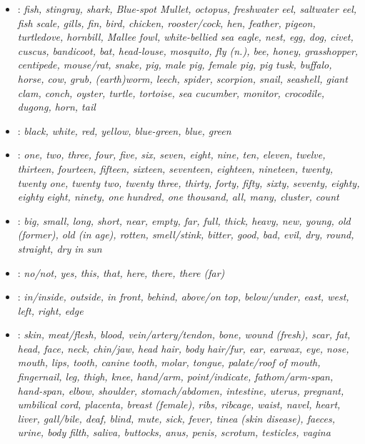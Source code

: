 \begin{itemize}
\item	{}: 
\it{fish},
\it{stingray},
shark,
Blue-spot Mullet,
octopus,
freshwater eel,
saltwater eel,
fish scale,
gills,
fin,
\it{bird},
chicken,
rooster/cock,
hen,
feather,
pigeon,
turtledove,
\it{hornbill},
Mallee fowl,
white-bellied sea eagle,
nest,
\it{egg},
\it{dog},
\it{civet},
\it{cuscus},
\it{bandicoot},
\it{bat},
\it{head-louse},
\it{mosquito},
\it{fly (n.)},
\it{bee},
honey,
grasshopper,
centipede,
\it{mouse/rat},
\it{snake},
\it{pig},
male pig,
female pig,
pig tusk,
buffalo,
\it{horse},
\it{cow},
\it{grub},
(earth)worm,
leech,
\it{spider},
\it{scorpion},
snail,
seashell,
giant clam,
conch,
oyster,
\it{turtle},
\it{tortoise},
\it{sea cucumber},
\it{monitor},
\it{crocodile},
\it{dugong},
\it{horn},
\it{tail}

\item	{}:
\it{black},
\it{white},
\it{red},
\it{yellow},
blue-green,
\it{blue},
\it{green}

\item	{}: 
\it{one},
\it{two},
\it{three},
\it{four},
\it{five},
\it{six},
\it{seven},
\it{eight},
\it{nine},
\it{ten},
eleven,
twelve,
thirteen,
fourteen,
fifteen,
sixteen,
seventeen,
eighteen,
nineteen,
\it{twenty},
twenty one,
twenty two,
twenty three,
thirty,
forty,
fifty,
sixty,
seventy,
eighty,
eighty eight,
ninety,
\it{one hundred},
\it{one thousand},
\it{all},
\it{many},
cluster,
count

\item	{}: \it{big},
\it{small},
\it{long},
\it{short},
near,
empty,
\it{far},
\it{full},
\it{thick},
\it{heavy},
\it{new},
\it{young},
\it{old (former)},
\it{old (in age)},
\it{rotten},
\it{smell/stink},
\it{bitter},
good,
bad,
\it{evil},
\it{dry},
\it{round},
\it{straight},
\it{dry in sun}

\item	{}: \it{no/not},
yes,
\it{this},
\it{that},
\it{here},
\it{there},
\it{there (far)}

\item	{}: 
\it{in/inside},
\it{outside},
\it{in front},
\it{behind},
\it{above/on top},
\it{below/under},
\it{east},
\it{west},
left,
right,
\it{edge}

\item	{}: 
\it{skin},
\it{meat/flesh},
\it{blood},
\it{vein/artery/tendon},
\it{bone},
wound (fresh),
scar,
fat,
\it{head},
\it{face},
\it{neck},
\it{chin/jaw},
\it{head hair},
\it{body hair/fur},
\it{ear},
earwax,
\it{eye},
\it{nose},
\it{mouth},
\it{lips},
\it{tooth},
canine tooth,
molar,
\it{tongue},
\it{palate/roof of mouth},
\it{fingernail},
\it{leg},
\it{thigh},
\it{knee},
\it{hand/arm},
\it{point/indicate},
\it{fathom/arm-span},
\it{hand-span},
\it{elbow},
\it{shoulder},
\it{stomach/abdomen},
intestine,
uterus,
\it{pregnant},
umbilical cord,
placenta,
\it{breast (female)},
\it{ribs},
ribcage,
\it{waist},
\it{navel},
\it{heart},
\it{liver},
\it{gall/bile},
\it{deaf},
\it{blind},
mute,
\it{sick},
fever,
\it{tinea (skin disease)},
\it{faeces},
\it{urine},
\it{body filth},
\it{saliva},
buttocks,
anus,
penis,
scrotum,
testicles,
vagina


\end{itemize}
